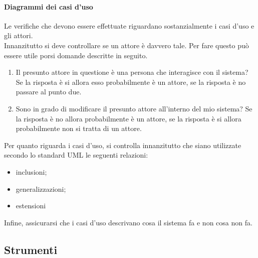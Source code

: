 			\paragraph{Diagrammi dei casi d'uso}
				Le verifiche che devono essere effettuate riguardano sostanzialmente i casi d'uso e gli attori.\\
				Innanzitutto si deve controllare se un attore è davvero tale. Per fare questo può essere utile porsi domande descritte in seguito.
				\begin{enumerate}
					\item Il presunto attore in questione è una persona che interagisce con il sistema? Se la risposta è si allora esso probabilmente 
					è un attore, se la risposta è no passare al punto due.
					\item Sono in grado di modificare il presunto attore all'interno del mio sistema? Se la risposta è no allora probabilmente è un attore, 
					se la risposta è si allora probabilmente non si tratta di un attore.
				\end{enumerate}
				Per quanto riguarda i casi d'uso, si controlla innanzitutto che siano utilizzate secondo lo standard UML le seguenti relazioni:
				\begin{itemize}
					\item inclusioni;
					\item generalizzazioni;
					\item estensioni
				\end{itemize}
				Infine, assicurarsi che i casi d'uso descrivano cosa il sistema fa e non cosa non fa.
	\subsection{Strumenti}
		